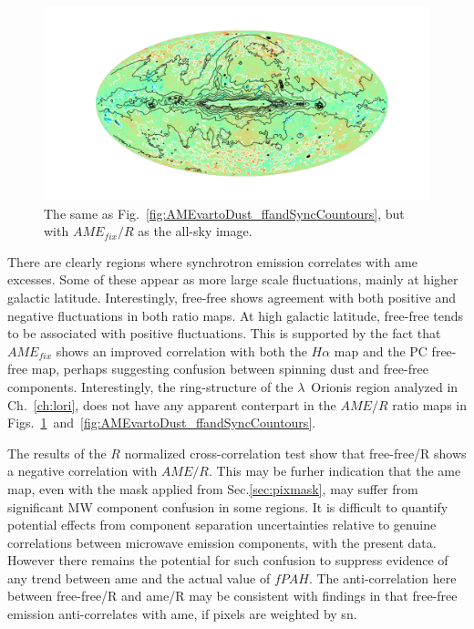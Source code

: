                 \begin{figure}
                    \includegraphics[width=\textwidth,trim={6cm 2cm 5.0cm 2cm},clip]{../Plots/ch_allsky/AMEfixtoDust_ffandSyncCountours.pdf}
                    \centering
                    \caption{The same as Fig.~\ref{fig:AMEvartoDust_ffandSyncCountours}, but with $AME_{fix}/R$ as the all-sky image.}
                    \label{fig:AMEfixtoDust_ffandSyncCountours}
                \end{figure}
             There are clearly regions where synchrotron emission correlates with \acrshort{ame} excesses. Some of these appear as more large scale fluctuations, mainly at higher galactic latitude. Interestingly, free-free shows agreement with both positive and negative fluctuations in both ratio maps. At high galactic latitude, free-free tends to be associated with positive fluctuations. This is supported by the fact that $AME_{fix}$ shows an improved correlation with both the $H\alpha{}$ map and the PC free-free map, perhaps suggesting confusion between spinning dust and free-free components. Interestingly, the ring-structure of the $\lambda$~Orionis region analyzed in Ch.~\ref{ch:lori}, does not have any apparent conterpart in the $AME/R$ ratio maps in Figs.~\ref{fig:AMEfixtoDust_ffandSyncCountours}~and~\ref{fig:AMEvartoDust_ffandSyncCountours}.

             The results of the $R$ normalized cross-correlation test show that free-free/R shows a negative correlation with $AME/R$. This may be furher indication that the \acrshort{ame} map, even with the mask applied from Sec.\ref{sec:pixmask}, may suffer from significant MW component confusion in some regions. It is difficult to quantify potential effects from component separation uncertainties relative to genuine correlations between microwave emission components, with the present data. However there remains the potential for such confusion to suppress evidence of any trend between \acrshort{ame} and the actual value of $fPAH$. The anti-correlation here between free-free/R and \acrshort{ame}/R may be consistent with findings in \cite{vonHausegger15} that free-free emission anti-correlates with \acrshort{ame}, if pixels are weighted by \acrshort{sn}.

